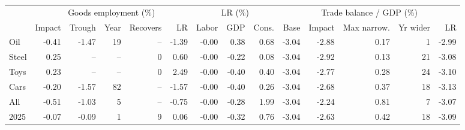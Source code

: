 \begin{tabular}{lrrrrrrrrrrrrr}
\toprule
 & \multicolumn{5}{c}{Goods employment (\%)} & \multicolumn{3}{c}{LR (\%)} & \multicolumn{5}{c}{Trade balance / GDP (\%)} \\
\cmidrule(lr){2-6}\cmidrule(lr){7-9}\cmidrule(lr){10-14}
 & Impact & Trough & Year & Recovers & LR & Labor & GDP & Cons. & Base & Impact & Max narrow. & Yr wider & LR \\
\midrule
Oil & -0.41 & -1.47 & 19 & -- & -1.39 & -0.00 & 0.38 & 0.68 & -3.04 & -2.88 & 0.17 & 1 & -2.99 \\
Steel & 0.25 & -- & -- & 0 & 0.60 & -0.00 & -0.22 & 0.08 & -3.04 & -2.92 & 0.13 & 21 & -3.08 \\
Toys & 0.23 & -- & -- & 0 & 2.49 & -0.00 & -0.40 & 0.40 & -3.04 & -2.77 & 0.28 & 24 & -3.10 \\
Cars & -0.20 & -1.57 & 82 & -- & -1.57 & -0.00 & -0.40 & 0.26 & -3.04 & -2.68 & 0.37 & 18 & -3.13 \\
All & -0.51 & -1.03 & 5 & -- & -0.75 & -0.00 & -0.28 & 1.99 & -3.04 & -2.24 & 0.81 & 7 & -3.07 \\
2025 & -0.07 & -0.09 & 1 & 9 & 0.06 & -0.00 & -0.32 & 0.76 & -3.04 & -2.63 & 0.42 & 18 & -3.09 \\
\bottomrule
\end{tabular}
